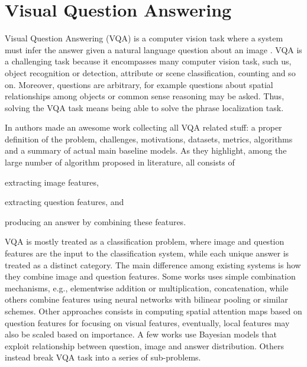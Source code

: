 \section{Visual Question Answering}
\label{sec:vqa}

Visual Question Answering (VQA) is a computer vision task where a
system must infer the answer given a natural language question about
an image \cite{kafle2017visual}. VQA is a challenging task because it
encompasses many computer vision task, such us, object recognition or
detection, attribute or scene classification, counting and so on.
Moreover, questions are arbitrary, for example questions about spatial
relationships among objects or common sense reasoning may be asked.
Thus, solving the VQA task means being able to solve the phrase
localization task.

In \cite{kafle2017visual} authors made an awesome work collecting all
VQA related stuff: a proper definition of the problem, challenges,
motivations, datasets, metrics, algorithms and a summary of actual
main baseline models. As they highlight, among the large number of
algorithm proposed in literature, all consists of
\begin{enumerate*}[label=(\roman*)] 
  \item extracting image features,
  \item extracting question features, and
  \item producing an answer by combining these features.
\end{enumerate*}
VQA is mostly treated as a classification problem, where image and
question features are the input to the classification system, while
each unique answer is treated as a distinct category. The main
difference among existing systems is how they combine image and
question features. Some works uses simple combination mechanisms,
e.g., elementwise addition or multiplication, concatenation, while
others combine features using neural networks with bilinear pooling or
similar schemes. Other approaches consists in computing spatial
attention maps based on question features for focusing on visual
features, eventually, local features may also be scaled based on
importance. A few works use Bayesian models that exploit relationship
between question, image and answer distribution. Others instead break
VQA task into a series of sub-problems.
